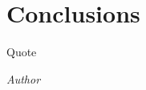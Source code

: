 \documentclass[class=report,11pt,crop=false]{standalone}
\begin{document}
\chapter{Conclusions}
\epigraph{Quote}%
    {\emph{Author}}

\blindtext






\ifstandalone

\fi
\end{document}
